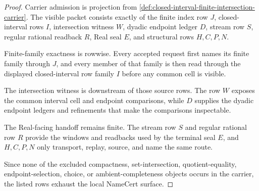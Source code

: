 \begin{proof}
Carrier admission is projection from \autoref{def:closed-interval-finite-intersection-carrier}. The visible packet consists exactly of the finite index row $J$, closed-interval rows $I$, intersection witness $W$, dyadic endpoint ledger $D$, stream row $S$, regular rational readback $R$, Real seal $E$, and structural rows $H,C,P,N$.

Finite-family exactness is rowwise. Every accepted request first names its finite family through $J$, and every member of that family is then read through the displayed closed-interval row family $I$ before any common cell is visible.

The intersection witness is downstream of those source rows. The row $W$ exposes the common interval cell and endpoint comparisons, while $D$ supplies the dyadic endpoint ledgers and refinements that make the comparisons inspectable.

The Real-facing handoff remains finite. The stream row $S$ and regular rational row $R$ provide the windows and readbacks used by the terminal seal $E$, and $H,C,P,N$ only transport, replay, source, and name the same route.

Since none of the excluded compactness, set-intersection, quotient-equality, endpoint-selection, choice, or ambient-completeness objects occurs in the carrier, the listed rows exhaust the local NameCert surface.
\end{proof}

